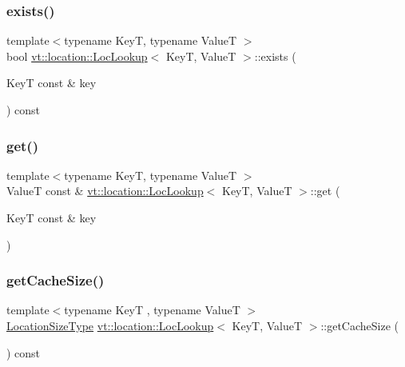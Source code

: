 \mbox{\label{structvt_1_1location_1_1_loc_lookup_ad1c4809e9687c975335fee019cc3e39b}} 
\subsubsection{\texorpdfstring{exists()}{exists()}}
{\footnotesize\ttfamily template$<$typename KeyT, typename ValueT $>$ \\
bool \hyperlink{structvt_1_1location_1_1_loc_lookup}{vt\+::location\+::\+Loc\+Lookup}$<$ KeyT, ValueT $>$\+::exists (\begin{DoxyParamCaption}\item[{KeyT const \&}]{key }\end{DoxyParamCaption}) const}

\mbox{\label{structvt_1_1location_1_1_loc_lookup_a3be47c30312499b386c2d459b4b81c9f}} 
\subsubsection{\texorpdfstring{get()}{get()}}
{\footnotesize\ttfamily template$<$typename KeyT, typename ValueT $>$ \\
ValueT const  \& \hyperlink{structvt_1_1location_1_1_loc_lookup}{vt\+::location\+::\+Loc\+Lookup}$<$ KeyT, ValueT $>$\+::get (\begin{DoxyParamCaption}\item[{KeyT const \&}]{key }\end{DoxyParamCaption})}

\mbox{\label{structvt_1_1location_1_1_loc_lookup_a95081b04f2cd212457ec56c579ba988b}} 
\subsubsection{\texorpdfstring{get\+Cache\+Size()}{getCacheSize()}}
{\footnotesize\ttfamily template$<$typename KeyT , typename ValueT $>$ \\
\hyperlink{namespacevt_1_1location_ab1c4c5849012a23eee2fbd1fce6159d7}{Location\+Size\+Type} \hyperlink{structvt_1_1location_1_1_loc_lookup}{vt\+::location\+::\+Loc\+Lookup}$<$ KeyT, ValueT $>$\+::get\+Cache\+Size (\begin{DoxyParamCaption}{ }\end{DoxyParamCaption}) const}

